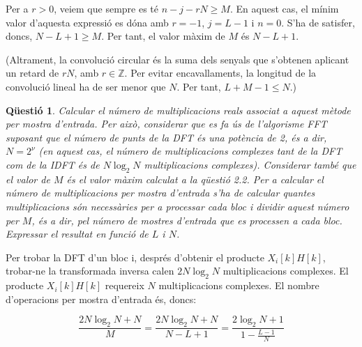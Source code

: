 \documentclass[11pt,a4]{article}
\numberwithin{equation}{section}
\theoremstyle{thmstyle}
\theoremstyle{thmstyle}
\theoremstyle{thmstyle}
\theoremstyle{thmstyle}
\theoremstyle{thmstyle}
\theoremstyle{thmstyle}
\newtheorem{question}{Qüestió}
\begin{document}
Per a $r>0$, veiem que sempre es té $n-j-rN\geqslant M$. En aquest cas, el mínim valor d'aquesta expressió es dóna amb $r = -1$, $j=L-1$ i $n=0$. S'ha de satisfer, doncs, $N-L+1\geqslant M$. Per tant, el valor màxim de $M$ és $N-L+1$.

(Altrament, la convolució circular és la suma dels senyals que s'obtenen aplicant un retard de $rN$, amb $r\in\mathbb{Z}$. Per evitar encavallaments, la longitud de la convolució lineal ha de ser menor que $N$. Per tant, $L+M-1\leqslant N$.)

\begin{question}
Calcular el número de multiplicacions reals associat a aquest mètode per mostra d’entrada. Per això, considerar que es fa ús de l’algorisme FFT suposant que el número de punts de la DFT és una potència de 2, és a dir, $N=2^\nu$ (en aquest cas, el número de multiplicacions complexes tant de la DFT com de la IDFT és de $N\log_2 N$ multiplicacions complexes). Considerar també que el valor de $M$ és el valor màxim calculat
a la qüestió 2.2. Per a calcular el número de multiplicacions per mostra d’entrada s’ha de calcular quantes multiplicacions són necessàries per a processar cada bloc i dividir aquest número per $M$, és a dir, pel número de mostres d’entrada que es processen a cada bloc. Expressar el resultat en funció de $L$ i $N$.
\end{question}

Per trobar la DFT d'un bloc i, després d'obtenir el producte $X_i[k]H[k]$, trobar-ne la transformada inversa calen $2N\log_2 N$ multiplicacions complexes. El producte $X_i[k]H[k]$ requereix $N$ multiplicacions complexes. El nombre d'operacions per mostra d'entrada és, doncs:

$$
\frac{2N\log_2 N + N}{M} = \frac{2N\log_2 N + N}{N-L+1} = \frac{2\log_2 N + 1}{1-\frac{L-1}{N}}
$$
\end{document}
